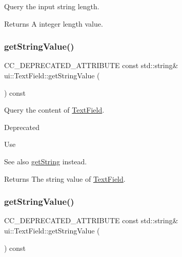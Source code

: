 Query the input string length. 

\begin{DoxyReturn}{Returns}
A integer length value. 
\end{DoxyReturn}
\mbox{\label{classui_1_1TextField_afc22b95a00cce564179260e456ad9ff3}} 
\subsubsection{\texorpdfstring{get\+String\+Value()}{getStringValue()}\hspace{0.1cm}{\footnotesize\ttfamily [1/2]}}
{\footnotesize\ttfamily C\+C\+\_\+\+D\+E\+P\+R\+E\+C\+A\+T\+E\+D\+\_\+\+A\+T\+T\+R\+I\+B\+U\+TE const std\+::string\& ui\+::\+Text\+Field\+::get\+String\+Value (\begin{DoxyParamCaption}{ }\end{DoxyParamCaption}) const\hspace{0.3cm}{\ttfamily [inline]}}

Query the content of \hyperlink{classui_1_1TextField}{Text\+Field}. \begin{DoxyRefDesc}{Deprecated}
\item[\hyperlink{deprecated__deprecated000164}{Deprecated}]Use\end{DoxyRefDesc}
\begin{DoxySeeAlso}{See also}
{\ttfamily \hyperlink{classui_1_1TextField_aba3ac805a106d31c280b864f970eb2e1}{get\+String}} instead. 
\end{DoxySeeAlso}
\begin{DoxyReturn}{Returns}
The string value of \hyperlink{classui_1_1TextField}{Text\+Field}. 
\end{DoxyReturn}
\mbox{\label{classui_1_1TextField_afc22b95a00cce564179260e456ad9ff3}} 
\subsubsection{\texorpdfstring{get\+String\+Value()}{getStringValue()}\hspace{0.1cm}{\footnotesize\ttfamily [2/2]}}
{\footnotesize\ttfamily C\+C\+\_\+\+D\+E\+P\+R\+E\+C\+A\+T\+E\+D\+\_\+\+A\+T\+T\+R\+I\+B\+U\+TE const std\+::string\& ui\+::\+Text\+Field\+::get\+String\+Value (\begin{DoxyParamCaption}{ }\end{DoxyParamCaption}) const\hspace{0.3cm}{\ttfamily [inline]}}

